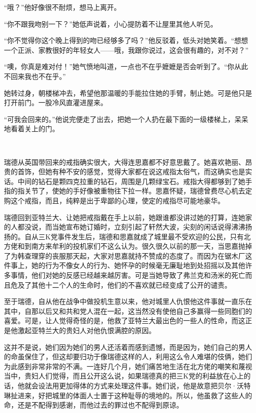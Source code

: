 \par “哦？”他好像很不耐烦，想马上离开。
\par “你不跟我吻别一下？”她低声说着，小心提防着不让屋里其他人听见。
\par “你不觉得你这个晚上得到的吻已经够多了吗？”他反驳着，低头对她笑着。“想想一个正派、家教很好的年轻女人——哦，我跟你说过，这会很有趣的，对不对？”
\par “噢，你真是难对付！”她气愤地叫道，一点也不在乎嬷嬷是否会听到了。“你从此不回来我也不在乎。”
\par 她转过身，朝楼梯冲去，希望他那温暖的手能拉住她的手臂，制止她。可是他只是打开前门。一股冷风直灌进屋来。
\par “可我会回来的。”他说完便走了出去，把她一个人扔在最下面的一级楼梯上，呆呆地看着关上的门。
\par  
\par 瑞德从英国带回来的戒指确实很大，大得连思嘉都不好意思戴了。她喜欢艳丽、昂贵的首饰，但她有种不安的感觉，觉得大家都在说这戒指太俗气，而这确实也是实话。中间的钻石是颗四克拉重的钻石，周围是几颗绿宝石。戒指大得都够到了她手指的指关节了，使她的手好像被重物往下拉一样。思嘉怀疑，瑞德曾费尽心机去定购这个戒指，而且，纯粹是出于卑鄙的心理，使定的戒指尽可能地豪华。
\par 瑞德回到亚特兰大、让她把戒指戴在手上以前，她跟谁都没讲过她的打算，连她家的人都没说，而当她宣布她订婚时，立刻引起了轩然大波，尖刻的闲话说得沸沸扬扬的。自从三K党事件发生后，瑞德和思嘉就成了城里最不受欢迎的公民，只有北方佬和到南方来牟利的投机家们不这么认为。很久很久以前的那一天，当思嘉抛掉了为韩查理穿的丧服那天起，大家对思嘉就持不赞成的态度了。而因为在锯木厂这件事上，她的行为不像女人的行为、她怀孕的时候毫无廉耻地到处招摇以及其他许多事情，他们对她的反感已经越来越厉害。可是当她导致了弗兰克和汤米的死亡而且危及了其他十二个人的生命时，他们的不喜欢就已经变成了公开的谴责。
\par 至于瑞德，自从他在战争中做投机生意以来，他对城里人仇恨他这件事就一直乐在其中，自那以后又和共和党人混在一起，这当然没有使他自己多赢得一些同胞们的喜爱。可是，让人觉得奇怪的是，他救了亚特兰大最出色的一些人的性命，而这正是他激起亚特兰大的贵妇人对他仇恨满腔的原因。
\par 这并不是说，她们因为她们的男人还活着而感到遗憾，而是因为，她们自己的男人的命虽保住了，但这却要归功于像瑞德这样的人，利用这么令人难堪的伎俩，她们为此感到非常非常的不满。一连好几个月，她们痛苦地生活在北方佬的嘲笑和蔑视当中，贵妇人们觉得，而且公开这么说，如果瑞德真的把三K党的利益放在心上的话，他就会设法用更加得体的方式来处理这件事。她们说，他是故意把贝尔·沃特琳扯进来，好把城里的体面人士置于这种耻辱的境地的。所以，他虽救了这些人的命，还是不配得到感谢，而他过去的罪过也不配得到原谅。
